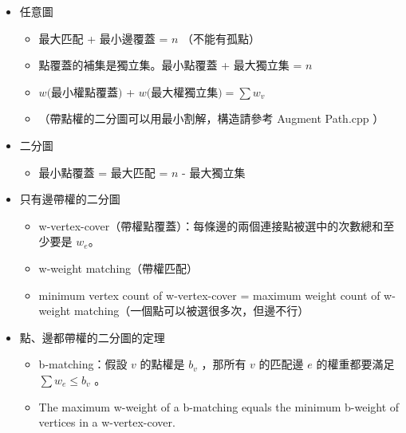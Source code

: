 \begin{itemize}
    \item 任意圖
        \begin{itemize}
            \item 最大匹配 + 最小邊覆蓋 = $n$ （不能有孤點）
            \item  點覆蓋的補集是獨立集。最小點覆蓋 + 最大獨立集 = $n$ 
            \item  $w($最小權點覆蓋$)$ + $w($最大權獨立集$) = \sum{w_v}$
            \item  （帶點權的二分圖可以用最小割解，構造請參考 Augment Path.cpp ）
        \end{itemize}
    \item 二分圖
        \begin{itemize}
            \item 最小點覆蓋 = 最大匹配 = $n$ - 最大獨立集
        \end{itemize}
    \item 只有邊帶權的二分圖
        \begin{itemize}
            \item w-vertex-cover（帶權點覆蓋）：每條邊的兩個連接點被選中的次數總和至少要是 $w_e$。
            \item w-weight matching（帶權匹配） 
            \item minimum vertex count of w-vertex-cover = maximum weight count of w-weight matching（一個點可以被選很多次，但邊不行）
        \end{itemize}
    \item 點、邊都帶權的二分圖的定理
        \begin{itemize}
            \item b-matching：假設 $v$ 的點權是 $b_v$ ，那所有 $v$ 的匹配邊 $e$ 的權重都要滿足 $\sum{w_e}\leq b_v$ 。
            \item The maximum w-weight of a b-matching equals the minimum b-weight of vertices in a w-vertex-cover.
        \end{itemize}
\end{itemize}
